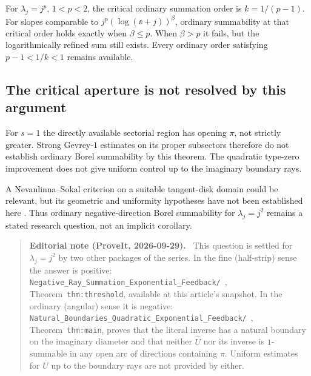 \documentclass[11pt,a4paper]{article}
\numberwithin{equation}{section}
\theoremstyle{definition}\newtheorem{definition}[theorem]{Definition}
\theoremstyle{remark}\newtheorem{remark}[theorem]{Remark}
\newcommand{\Uhat}{\widehat U}\newcommand{\Qhat}{\widehat Q}\newcommand{\Vhat}{\widehat V}
\newenvironment{ednote}{\par\smallskip\begin{quote}\small\raggedright\textbf{Editorial note (ProveIt, 2026-09-29).}\ }{\end{quote}\smallskip}
\begin{document}
For $\lambda_j=j^p$, $1<p<2$, the critical ordinary summation order is
$k=1/(p-1)$. For slopes comparable to
$j^p(\log(\ee+j))^\beta$, ordinary summability at that critical order
holds exactly when $\beta\le p$. When $\beta>p$ it fails, but the
logarithmically refined sum still exists. Every ordinary order satisfying
$p-1<1/k<1$ remains available.

\subsection{The critical aperture is not resolved by this argument}
For $s=1$ the directly available sectorial region has opening $\pi$, not
strictly greater. Strong Gevrey-$1$ estimates on its proper subsectors
therefore do not establish ordinary Borel summability by this theorem.
The quadratic type-zero improvement does not give uniform control up to
the imaginary boundary rays.

A Nevanlinna--Sokal criterion on a suitable tangent-disk domain could be
relevant, but its geometric and uniformity hypotheses have not been
established here \cite{sokal}. Thus ordinary negative-direction Borel
summability for $\lambda_j=j^2$ remains a stated research question, not
an implicit corollary.
\begin{ednote}
This question is settled for $\lambda_j=j^2$ by two other packages of
the series. In the fine (half-strip) sense the answer is positive: \nolinkurl{Negative_Ray_Summation_Exponential_Feedback/}~\cite{ed:negativeray}, Theorem~\texttt{thm:threshold}, available at this article's snapshot. In
the ordinary (angular) sense it is negative: \nolinkurl{Natural_Boundaries_Quadratic_Exponential_Feedback/}~\cite{ed:naturalboundaries}, Theorem~\texttt{thm:main},
proves that the literal inverse has a natural boundary on the imaginary
diameter and that neither $\Uhat$ nor its inverse is $1$-summable in any
open arc of directions containing $\pi$. Uniform estimates for $U$ up to
the boundary rays are not provided by either.
\end{ednote}
\end{document}
